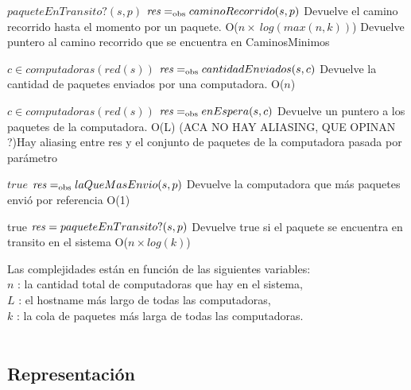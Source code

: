  {$paqueteEnTransito?(s,p)$}
 {$\text{\textit{res}} =_{\mathrm{obs}} caminoRecorrido(s,p)$}
 {Devuelve el camino recorrido hasta el momento por un paquete.}
 {O($n \times\  log(max(n,k))$)}
 {Devuelve puntero al camino recorrido que se encuentra en CaminosMinimos}

 {$c \in computadoras(red(s))$}
 {$\text{\textit{res}} =_{\mathrm{obs}} cantidadEnviados(s,c)$}
 {Devuelve la cantidad de paquetes enviados por una computadora.}
 {O($n$)} %
{}

 
 {$c \in computadoras(red(s))$}
 {$\text{\textit{res}} =_{\mathrm{obs}} enEspera(s,c)$}
 {Devuelve un puntero a los paquetes de la computadora.}
 {O(L)}
 {(ACA NO HAY ALIASING, QUE OPINAN ?)Hay aliasing entre res y el conjunto de paquetes de la computadora pasada por parámetro}

 
 {$true$}
 {$\text{\textit{res}} =_{\mathrm{obs}} laQueMasEnvio(s,p)$}
 {Devuelve la computadora que más paquetes envió por referencia} 
 {O(1)}
 
 

 
{true}
{$\text{\textit{res}} = paqueteEnTransito?(s,p)$}
{Devuelve true si el paquete se encuentra en transito en el sistema}
{O($n \times log(k)$)}
{}

 
Las complejidades están en función de las siguientes variables:\\
$n$ : la cantidad total de computadoras que hay en el sistema, \\
$L$ : el hostname más largo de todas las computadoras, \\
$k$ : la cola de paquetes más larga de todas las computadoras. 
\\ \\



\subsection{Representación}


